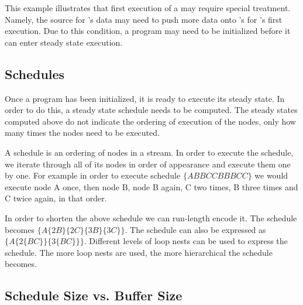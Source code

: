This example illustrates that first execution of a {\filter} may
require special treatment.  Namely, the source for {\filter}'s data
may need to push more data onto {\filter}'s {\Input} {{\Channel}} for
{\filter}'s first execution.  Due to this condition, a {\StreamIt}
program may need to be initialized before it can enter steady
state execution.

\begin{comment}
There are other constraints (latency constraints) which may
require more complex initialization.  These will be discussed in
Chapter \ref{chpt:constrained}.

After an execution, a {\filter} $f$ must leave at least $e_f - o_f$
data on its {\Input} {{\Channel}}.  Thus, if the only constraints on
initialization are peek-related, it is a sufficient condition for
entering steady state schedule that $\forall f \in {\filters}, in_f
\ge e_f - o_f$.

Specific strategies for generating initialization schedules for
peeking will be presented in Chapter \ref{chpt:hierarchical} and
Chapter \ref{chpt:phased}.
\end{comment}

\subsection{Schedules}
\label{sec:general:schedules}

Once a program has been initialized, it is ready to execute its
steady state. In order to do this, a steady state schedule needs
to be computed. The steady states computed above do not indicate
the ordering of execution of the nodes, only how many times the
nodes need to be executed.

A schedule is an ordering of nodes in a {\StreamIt} stream. In
order to execute the schedule, we iterate through all of its nodes
in order of appearance and execute them one by one.  For example
in order to execute schedule $\{ABBCCBBBCC\}$ we would execute
node A once, then node B, node B again, C two times, B three times
and C twice again, in that order.

In order to shorten the above schedule we can run-length encode
it.  The schedule becomes $\{A \{2B\}\{2C\}\{3B\}\{3C\}\}$. The
schedule can also be expressed as $\{A \{2 \{BC\}\}\{3\{BC\}\}\}$.
Different levels of loop nests can be used to express the
schedule. The more loop nests are used, the more hierarchical the
schedule becomes.

\subsection{Schedule Size vs. Buffer Size}
\label{sec:sched-vs-buffer}

